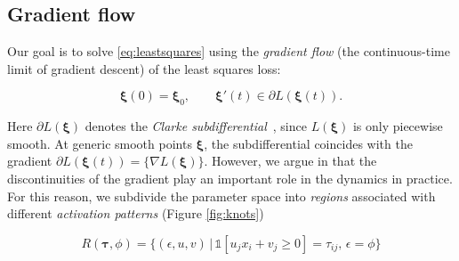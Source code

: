 \subsection{Gradient flow}

Our goal is to solve \eqref{eq:leastsquares} using the \emph{gradient flow} (the continuous-time limit of gradient descent) of the least squares loss:

\begin{equation}\label{eq:gradient_flow}
    \bm \xi(0) = \bm \xi_0, \qquad \bm \xi'(t) \in \partial L(\bm \xi(t)).
\end{equation}

Here $\partial L(\bm \xi)$ denotes the \emph{Clarke subdifferential}~\cite{clarke1975generalized}, since $L(\bm \xi)$ is only piecewise smooth. At generic smooth points $\bm \xi$, the subdifferential coincides with the gradient $\partial L(\bm \xi(t)) = \{\nabla L(\bm \xi)\}$. However, we argue in  that the discontinuities of the gradient play an important role in the dynamics in practice. For this reason, we subdivide the parameter space into \emph{regions} associated with different \emph{activation patterns} (Figure \ref{fig:knots})

\begin{equation}
    R(\bm \tau, \phi) = \{ (\epsilon, u, v) \, | \, \mathds 1 [u_j x_i + v_j \geq 0] = \tau_{ij}, \, \epsilon = \phi \}
\end{equation}


